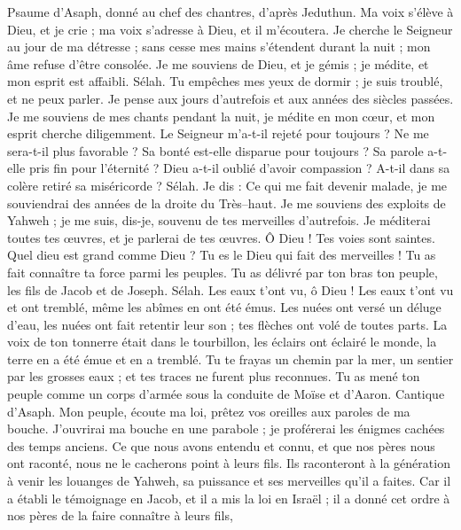 \begin{multicols}{2}
\VerseOne{}Psaume d'Asaph, donné au chef des chantres, d'après Jeduthun.
Ma voix s'élève à Dieu, et je crie ; ma voix s'adresse à Dieu, et il m'écoutera.
Je cherche le Seigneur au jour de ma détresse ; sans cesse mes mains s'étendent durant la nuit ; mon âme refuse d'être consolée.
Je me souviens de Dieu, et je gémis ; je médite, et mon esprit est affaibli. Sélah.
Tu empêches mes yeux de dormir ; je suis troublé, et ne peux parler.
Je pense aux jours d'autrefois et aux années des siècles passées.
Je me souviens de mes chants pendant la nuit, je médite en mon cœur, et mon esprit cherche diligemment.
Le Seigneur m'a-t-il rejeté pour toujours ? Ne me sera-t-il plus favorable ?
Sa bonté est-elle disparue pour toujours ? Sa parole a-t-elle pris fin pour l'éternité ?
Dieu a-t-il oublié d'avoir compassion ? A-t-il dans sa colère retiré sa miséricorde ? Sélah.
Je dis : Ce qui me fait devenir malade, je me souviendrai des années de la droite du Très–haut.
Je me souviens des exploits de Yahweh ; je me suis, dis-je, souvenu de tes merveilles d'autrefois.
Je méditerai toutes tes œuvres, et je parlerai de tes œuvres.
Ô Dieu ! Tes voies sont saintes. Quel dieu est grand comme Dieu ?
Tu es le Dieu qui fait des merveilles ! Tu as fait connaître ta force parmi les peuples.
Tu as délivré par ton bras ton peuple, les fils de Jacob et de Joseph. Sélah.
Les eaux t'ont vu, ô Dieu ! Les eaux t'ont vu et ont tremblé, même les abîmes en ont été émus.
Les nuées ont versé un déluge d'eau, les nuées ont fait retentir leur son ; tes flèches ont volé de toutes parts.
La voix de ton tonnerre était dans le tourbillon, les éclairs ont éclairé le monde, la terre en a été émue et en a tremblé.
Tu te frayas un chemin par la mer, un sentier par les grosses eaux ; et tes traces ne furent plus reconnues.
Tu as mené ton peuple comme un corps d'armée sous la conduite de Moïse et d'Aaron.
\VerseOne{}Cantique d'Asaph. Mon peuple, écoute ma loi, prêtez vos oreilles aux paroles de ma bouche.
J'ouvrirai ma bouche en une parabole ; je proférerai les énigmes cachées des temps anciens.
Ce que nous avons entendu et connu, et que nos pères nous ont raconté,
nous ne le cacherons point à leurs fils. Ils raconteront à la génération à venir les louanges de Yahweh, sa puissance et ses merveilles qu'il a faites.
Car il a établi le témoignage en Jacob, et il a mis la loi en Israël ; il a donné cet ordre à nos pères de la faire connaître à leurs fils,

\end{multicols}
